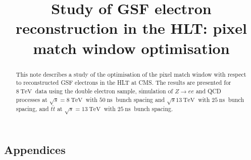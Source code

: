 \documentclass{cmspaper}
\newcommand{\ns} {~\mathrm{ns\ }}
\newcommand{\tev}{~\mathrm{TeV\ }}
\begin{document}
\title{Study of GSF electron reconstruction in the HLT: pixel match window optimisation}

\begin{abstract}
This note describes a study of the optimisation of the pixel match window with respect to reconstructed GSF electrons in the HLT at CMS.  The results are presented for $8\tev$ data using the double electron sample, simulation of $Z\to ee$ and QCD processes at $\sqrt{s}=8\tev$ with $50\ns$ bunch spacing and $\sqrt{s}13\tev$ with $25\ns$ bunch spacing, and $\bar{tt}$ at $\sqrt{s}=13\tev$ with $25\ns$ bunch spacing.
\end{abstract}

\clearpage

\tableofcontents



\clearpage

\clearpage

\clearpage


\clearpage
\begin{appendix}
\section{Appendices}


\clearpage

\clearpage

\clearpage

\clearpage

\end{appendix}
\end{document}
